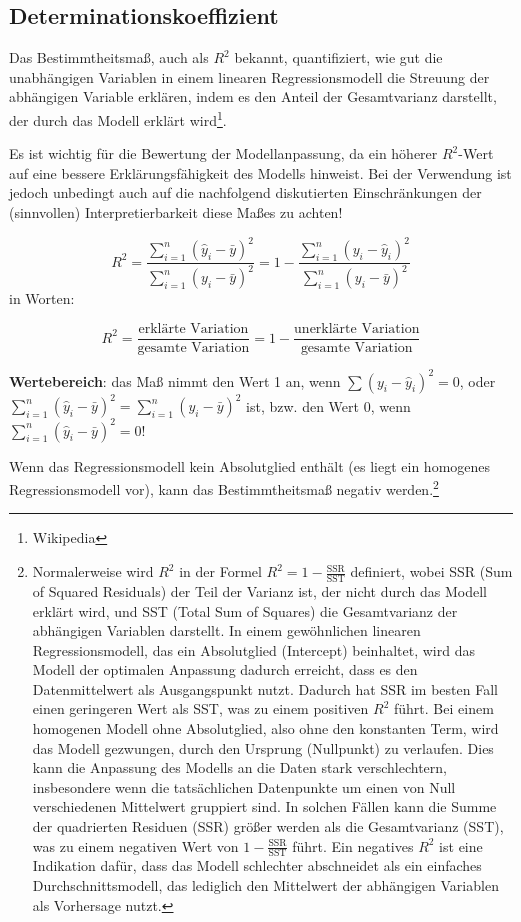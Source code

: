 \documentclass[
]{article}
\begin{document}
\subsection*{Determinationskoeffizient}\label{determinationskoeffizient}

Das Bestimmtheitsmaß, auch als \(R^2\) bekannt, quantifiziert, wie gut die unabhängigen Variablen in einem linearen Regressionsmodell die Streuung der abhängigen Variable erklären, indem es den Anteil der Gesamtvarianz darstellt, der durch das Modell erklärt wird\footnote{Wikipedia}.

Es ist wichtig für die Bewertung der Modellanpassung, da ein höherer \(R^2\)-Wert auf eine bessere Erklärungsfähigkeit des Modells hinweist. Bei der Verwendung ist jedoch unbedingt auch auf die nachfolgend diskutierten Einschränkungen der (sinnvollen) Interpretierbarkeit diese Maßes zu achten!

\[R^2 = \frac{\sum_{i=1}^{n} (\hat{y}_i - \bar{y})^2}{\sum_{i=1}^{n} (y_i - \bar{y})^2} = 1- \frac{\sum_{i=1}^{n} (y_i - \hat{y}_i)^2}{\sum_{i=1}^{n} (y_i - \bar{y})^2}\]
in Worten:

\[R^2 = \frac{\textrm{erklärte Variation}}{\textrm{gesamte Variation}} = 1 - \frac{\textrm{unerklärte Variation}}{\textrm{gesamte Variation}}\]

\textbf{Wertebereich}: das Maß nimmt den Wert 1 an, wenn \(\sum (y_i - \hat{y}_i)^2 = 0\), oder \(\sum_{i=1}^{n} (\hat{y}_i - \bar{y})^2 = \sum_{i=1}^{n} (y_i - \bar{y})^2\) ist, bzw. den Wert 0, wenn \(\sum_{i=1}^{n} (\hat{y}_i - \bar{y})^2 = 0\)!

Wenn das Regressionsmodell kein Absolutglied enthält (es liegt ein homogenes Regressionsmodell vor), kann das Bestimmtheitsmaß negativ werden.\footnote{Normalerweise wird \(R^2\) in der Formel \(R^2 = 1 - \frac{\text{SSR}}{\text{SST}}\) definiert, wobei SSR (Sum of Squared Residuals) der Teil der Varianz ist, der nicht durch das Modell erklärt wird, und SST (Total Sum of Squares) die Gesamtvarianz der abhängigen Variablen darstellt. In einem gewöhnlichen linearen Regressionsmodell, das ein Absolutglied (Intercept) beinhaltet, wird das Modell der optimalen Anpassung dadurch erreicht, dass es den Datenmittelwert als Ausgangspunkt nutzt. Dadurch hat SSR im besten Fall einen geringeren Wert als SST, was zu einem positiven \(R^2\) führt. Bei einem homogenen Modell ohne Absolutglied, also ohne den konstanten Term, wird das Modell gezwungen, durch den Ursprung (Nullpunkt) zu verlaufen. Dies kann die Anpassung des Modells an die Daten stark verschlechtern, insbesondere wenn die tatsächlichen Datenpunkte um einen von Null verschiedenen Mittelwert gruppiert sind. In solchen Fällen kann die Summe der quadrierten Residuen (SSR) größer werden als die Gesamtvarianz (SST), was zu einem negativen Wert von \(1 - \frac{\text{SSR}}{\text{SST}}\) führt. Ein negatives \(R^2\) ist eine Indikation dafür, dass das Modell schlechter abschneidet als ein einfaches Durchschnittsmodell, das lediglich den Mittelwert der abhängigen Variablen als Vorhersage nutzt.}
\end{document}
